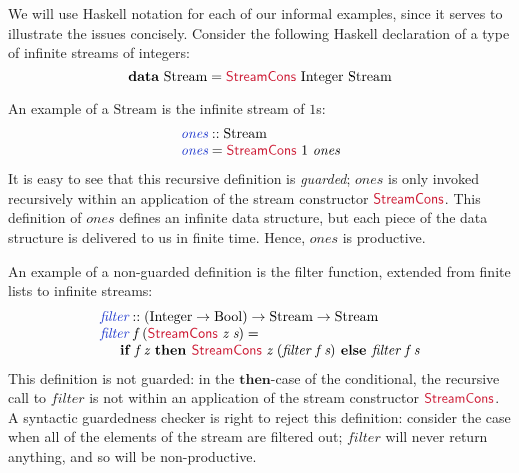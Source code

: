 \documentclass[natbib]{sigplanconf}
\newcommand{\cons}[1]{\textcolor{cons}{\textsf{#1}}}
\newcommand{\kw}[1]{\textbf{#1}}
\newcommand{\tyname}[1]{\textrm{#1}}
\newcommand{\ident}[1]{\textit{#1}}
\newcommand{\defn}[1]{\textcolor{defnd}{\ident{#1}}}
\begin{document}
We will use Haskell notation for each of our informal examples, since
it serves to illustrate the issues concisely. Consider the following
Haskell declaration of a type of infinite streams of integers:
\begin{displaymath}
  \kw{data}\ \tyname{Stream} = \cons{StreamCons}\ \tyname{Integer}\ \tyname{Stream}
\end{displaymath}

An example of a $\tyname{Stream}$ is the infinite stream of $1$s:
\begin{displaymath}
  \begin{array}{l}
    \defn{ones} :: \tyname{Stream} \\
    \defn{ones} = \cons{StreamCons}\ 1\ \ident{ones}
  \end{array}
\end{displaymath}
It is easy to see that this recursive definition is \emph{guarded};
$\ident{ones}$ is only invoked recursively within an application of
the stream constructor $\cons{StreamCons}$. This definition of
$\ident{ones}$ defines an infinite data structure, but each piece of
the data structure is delivered to us in finite time. Hence,
$\ident{ones}$ is productive.

An example of a non-guarded definition is the filter function,
extended from finite lists to infinite streams:
\begin{displaymath}
  \begin{array}{l}
    \defn{filter} :: (\tyname{Integer} \to \tyname{Bool}) \to \tyname{Stream} \to \tyname{Stream} \\
    \defn{filter}\ \ident{f}\ (\cons{StreamCons}\ \ident{z}\ \ident{s}) = \\
    \hspace{0.5cm}\kw{if }\ident{f}\ \ident{z}\kw{ then }\cons{StreamCons}\ \ident{z}\ (\ident{filter}\ \ident{f}\ \ident{s})\kw{ else }\ident{filter}\ \ident{f}\ \ident{s}
  \end{array}
\end{displaymath}
This definition is not guarded: in the $\kw{then}$-case of the
conditional, the recursive call to $\ident{filter}$ is not within an
application of the stream constructor $\cons{StreamCons}$. A syntactic
guardedness checker is right to reject this definition: consider the
case when all of the elements of the stream are filtered out;
$\ident{filter}$ will never return anything, and so will be
non-productive.
\end{document}
